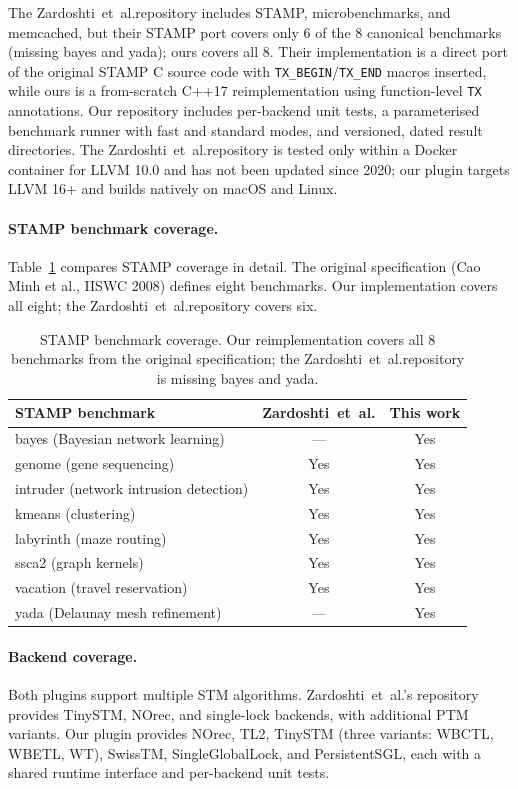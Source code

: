 \documentclass[article,12pt]{article}
\newcommand{\ZardoshtiEtAl}{Zardoshti~et~al.}
\begin{document}
The \ZardoshtiEtAl repository includes STAMP, microbenchmarks, and memcached, but
their STAMP port covers only 6 of the 8 canonical benchmarks (missing bayes and
yada); ours covers all 8.  Their implementation is a direct port of the original
STAMP C source code with \texttt{TX\_BEGIN}/\texttt{TX\_END} macros inserted,
while ours is a from-scratch C++17 reimplementation using function-level
\texttt{TX} annotations.  Our repository
includes per-backend unit tests, a parameterised benchmark runner with fast and
standard modes, and versioned, dated result directories.  The \ZardoshtiEtAl repository
is tested only within a Docker container for LLVM 10.0 and has not been updated
since 2020; our plugin targets LLVM 16+ and builds natively on macOS and Linux.

\paragraph{STAMP benchmark coverage.}
Table~\ref{tab:stamp-comparison} compares STAMP coverage in detail.
The original specification (Cao Minh et al., IISWC 2008) defines eight
benchmarks.  Our implementation covers all eight; the \ZardoshtiEtAl repository
covers six.

\begin{table}[h]
\centering
\begin{tabular}{lcc}
\toprule
STAMP benchmark & \ZardoshtiEtAl & This work \\
\midrule
bayes (Bayesian network learning) & --- & Yes \\
genome (gene sequencing) & Yes & Yes \\
intruder (network intrusion detection) & Yes & Yes \\
kmeans (clustering) & Yes & Yes \\
labyrinth (maze routing) & Yes & Yes \\
ssca2 (graph kernels) & Yes & Yes \\
vacation (travel reservation) & Yes & Yes \\
yada (Delaunay mesh refinement) & --- & Yes \\
\bottomrule
\end{tabular}
\caption{STAMP benchmark coverage.  Our reimplementation covers all 8 benchmarks
from the original specification; the \ZardoshtiEtAl repository is missing bayes and yada.}
\label{tab:stamp-comparison}
\end{table}

\paragraph{Backend coverage.}  Both plugins support multiple STM algorithms.
\ZardoshtiEtAl's repository provides TinySTM, NOrec, and single-lock backends, with
additional PTM variants.  Our plugin provides NOrec, TL2, TinySTM (three
variants: WBCTL, WBETL, WT), SwissTM, SingleGlobalLock, and PersistentSGL,
each with a shared runtime interface and per-backend unit tests.
\end{document}
